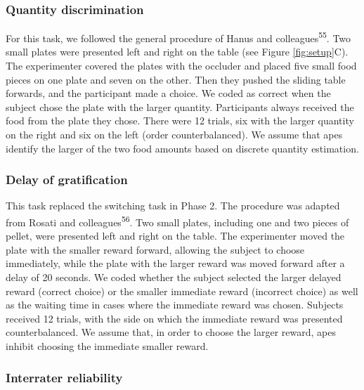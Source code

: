\documentclass[
  man,floatsintext]{apa6}
\begin{document}
\hypertarget{quantity-discrimination}{%
\subsubsection{Quantity discrimination}\label{quantity-discrimination}}

For this task, we followed the general procedure of Hanus and colleagues\textsuperscript{55}. Two small plates were presented left and right on the table (see Figure \ref{fig:setup}C). The experimenter covered the plates with the occluder and placed five small food pieces on one plate and seven on the other. Then they pushed the sliding table forwards, and the participant made a choice. We coded as correct when the subject chose the plate with the larger quantity. Participants always received the food from the plate they chose. There were 12 trials, six with the larger quantity on the right and six on the left (order counterbalanced). We assume that apes identify the larger of the two food amounts based on discrete quantity estimation.

\hypertarget{delay-of-gratification}{%
\subsubsection{Delay of gratification}\label{delay-of-gratification}}

This task replaced the switching task in Phase 2. The procedure was adapted from Rosati and colleagues\textsuperscript{56}. Two small plates, including one and two pieces of pellet, were presented left and right on the table. The experimenter moved the plate with the smaller reward forward, allowing the subject to choose immediately, while the plate with the larger reward was moved forward after a delay of 20 seconds. We coded whether the subject selected the larger delayed reward (correct choice) or the smaller immediate reward (incorrect choice) as well as the waiting time in cases where the immediate reward was chosen. Subjects received 12 trials, with the side on which the immediate reward was presented counterbalanced. We assume that, in order to choose the larger reward, apes inhibit choosing the immediate smaller reward.

\hypertarget{interrater-reliability}{%
\subsubsection{Interrater reliability}\label{interrater-reliability}}
\end{document}
